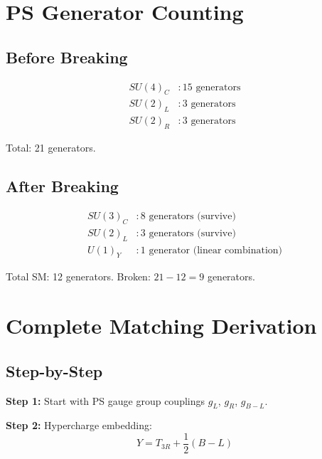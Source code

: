 \documentclass[11pt,a4paper]{article}
\begin{document}
\section{PS Generator Counting}
\label{app:generators}

\subsection{Before Breaking}
\label{app:before-breaking}

\begin{align}
\label{eq:gen-su4}
SU(4)_C &: 15 \text{ generators} \\
\label{eq:gen-su2l}
SU(2)_L &: 3 \text{ generators} \\
\label{eq:gen-su2r}
SU(2)_R &: 3 \text{ generators}
\end{align}

Total: 21 generators.

\subsection{After Breaking}
\label{app:after-breaking}

\begin{align}
\label{eq:sm-su3}
SU(3)_C &: 8 \text{ generators (survive)} \\
\label{eq:sm-su2}
SU(2)_L &: 3 \text{ generators (survive)} \\
\label{eq:sm-u1}
U(1)_Y &: 1 \text{ generator (linear combination)}
\end{align}

Total SM: 12 generators.
Broken: $21 - 12 = 9$ generators.

\section{Complete Matching Derivation}
\label{app:complete-matching}

\subsection{Step-by-Step}
\label{app:step-by-step}

\textbf{Step 1:} Start with PS gauge group couplings $g_L$, $g_R$, $g_{B-L}$.

\textbf{Step 2:} Hypercharge embedding:
\begin{equation}
\label{eq:step2}
Y = T_{3R} + \frac{1}{2}(B-L)
\end{equation}
\end{document}
